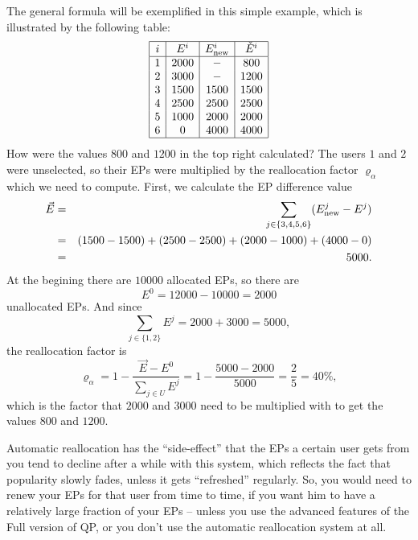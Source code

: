 \documentclass[a4paper,12pt]{scrartcl}
\newcounter{formula}
\newcounter{example}
\newcounter{comment}
\begin{document}
\begin{mdframed}[style=example]
 The general formula will be exemplified in this simple example, which is illustrated by the following table:
 $$\begin{array}{|c|c|c|c|}
 \hline
    i & E^i & E^i_{\mbox{\scriptsize{new}}} & \check{E}^i \\
    \hline
    1 & 2000 & - & 800 \\
    2 & 3000 & - & 1200 \\
    3 & 1500 & 1500 & 1500 \\
    4 & 2500 & 2500 & 2500 \\
    5 & 1000 & 2000 & 2000 \\
    6 & 0 & 4000 & 4000\\
    \hline
   \end{array}$$
How were the values $800$ and $1200$ in the top right calculated? The users $1$ and $2$ were unselected, so their EPs were multiplied by the reallocation factor $\varrho_\alpha$ which we need to compute. First, we calculate the EP difference value
\begin{eqnarray*}
   \vec{E} & = & \sum_{j \in \{3,4,5,6\}} (E^j_{\mbox{\scriptsize{new}}} - E^j) \\
   & = & (1500-1500)+(2500-2500)+(2000-1000)+(4000-0)\\
   & = & 5000.
  \end{eqnarray*}
At the begining there are $10000$ allocated EPs, so there are
$$E^0 = 12000 - 10000 =2000$$
unallocated EPs. And since
$$\sum_{j \in \{1,2\}} E^j = 2000 + 3000 = 5000,$$
the reallocation factor is
$$\varrho_{\alpha} = 1 - \frac{\vec{E} - E^0}{\sum_{j \in U} E^j} = 1 - \frac{5000 - 2000}{5000} = \frac{2}{5} = 40\%,$$
which is the factor that $2000$ and $3000$ need to be multiplied with to get the values $800$ and $1200$.
\end{mdframed}

\begin{mdframed}[style=comment, comment=Fading Esteem as Side Effect of Automatic Reallocation]
Automatic reallocation has the ``side-effect'' that the EPs a certain user gets from you tend to decline after a while with this system, which reflects the fact that popularity slowly fades, unless it gets ``refreshed'' regularly. So, you would need to renew your EPs for that user from time to time, if you want him to have a relatively large fraction of your EPs – unless you use the advanced features of the Full version of QP, or you don't use the automatic reallocation system at all. 
\end{mdframed}
\end{document}
